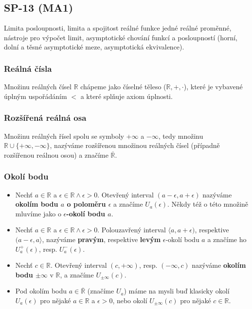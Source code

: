 \subsection{SP-13 (MA1)}
Limita posloupnosti, limita a spojitost reálné funkce jedné reálné proměnné, nástroje pro výpočet limit, asymptotické chování funkcí a posloupností (horní, dolní a těsné asymptotické meze, asymptotická ekvivalence).

\subsubsection*{Reálná čísla}
Množinu reálných čísel $\mathbb{R}$ chápeme jako číselné těleso ($\mathbb{R},+,\cdot$), které je vybavené úplným uspořádáním $<$ a které splňuje axiom úplnosti.

\subsubsection*{Rozšířená reálná osa}
Množinu reálných řísel spolu se symboly $+\infty$ a $-\infty$, tedy množinu $\mathbb{R} \cup \{+\infty, -\infty\}$, nazýváme rozšířenou množinou reálných čísel (případně rozšířenou reálnou osou) a značíme $\overline{\mathbb{R}}$.

\subsubsection*{Okolí bodu}
\begin{itemize}
	\item Nechť $a \in \mathbb{R}$ a $\epsilon \in \mathbb{R} \land \epsilon > 0$. Otevřený interval $(a - \epsilon, a + \epsilon)$ nazýváme \textbf{okolím bodu $a$ o poloměru $\epsilon$} a značíme $U_a(\epsilon)$. Někdy též o této množině mluvíme jako o \textbf{$\epsilon$-okolí bodu $a$}.
	\item Nechť $a \in \mathbb{R}$ a $\epsilon \in \mathbb{R} \land \epsilon > 0$. Polouzavřený interval $\langle a, a + \epsilon)$,  respektive $(a - \epsilon, a \rangle$, nazýváme \textbf{pravým}, respektive \textbf{levým} $\epsilon$-okolí bodu $a$ a značíme ho $U_a^+(\epsilon)$, resp. $U_a^{\minus}(\epsilon)$.
	\item Nechť $c\in \mathbb{R}$. Otevřený interval $(c, + \infty)$, resp. $(- \infty, c)$ nazýváme \textbf{okolím bodu $\pm \infty$} v $\mathbb{R}$, a značíme $U_{\pm\infty}(c)$.
	\item Pod okolím bodu $a \in \overline{\mathbb{R}}$ (značíme $U_a$) máme na mysli buď klasicky okolí $U_a(\epsilon)$ pro nějaké $a \in \mathbb{R}$ a $\epsilon > 0$, nebo okolí $U_{\pm \infty}(c)$ pro nějaké $c \in \mathbb{R}$.
\end{itemize}

